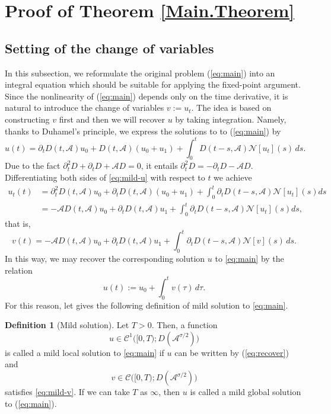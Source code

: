 \documentclass[a4paper,11pt]{article} %
\theoremstyle{remark}
\theoremstyle{definition}
\newtheorem{definition}{Definition}[section]
\numberwithin{equation}{section}
\begin{document}
\section{Proof of Theorem \ref{Main.Theorem}}\label{Sec.Proof}

\subsection{Setting of the change of variables}\label{Sec.Initial}

In this subsection, we reformulate the original problem (\ref{eq:main}) into an integral equation which should be suitable for applying the fixed-point argument. Since the nonlinearity of (\ref{eq:main}) depends only on the time derivative, it is natural to introduce the change of variables $v:=u_t$. The idea is based on constructing \(v\) first and then we will recover \(u\) by taking integration. Namely, thanks to Duhamel's principle, we express the solutions to to (\ref{eq:main}) by
\begin{equation}\label{eq:mild-u}
u(t)
=
\partial_tD(t,\mathcal{A})u_0
+
D(t,\mathcal{A})(u_0+u_1)
+
\int_0^t
D(t-s,\mathcal{A})\mathcal{N}[u_t](s)\,ds.
\end{equation}
Due to the fact $\partial_t^2 D+\partial_t D+\mathcal{A}D=0$, it entails
$\partial_t^2D=-\partial_tD-\mathcal{A}D$. Differentiating both sides of \eqref{eq:mild-u} with respect to $t$ we achieve
\begin{align*}
u_t(t)
&=
\partial_t^2D(t,\mathcal{A})u_0
+
\partial_tD(t,\mathcal{A})(u_0+u_1)
+
\int_0^t
\partial_tD(t-s,\mathcal{A})
\mathcal{N}[u_t](s)ds
\\
&=
-\mathcal{A}D(t,\mathcal{A})u_0
+
\partial_tD(t,\mathcal{A})u_1
+
\int_0^t
\partial_tD(t-s,\mathcal{A})
\mathcal{N}[u_t](s)ds,
\end{align*}
that is,
\begin{equation}\label{eq:mild-v}
v(t)
=
-\mathcal{A}D(t,\mathcal{A})u_0
+
\partial_tD(t,\mathcal{A})u_1
+
\int_0^t
\partial_tD(t-s,\mathcal{A})
\mathcal{N}[v](s)\,ds.
\end{equation}
In this way, we may recover the corresponding solution \(u\) to \eqref{eq:main} by the relation
\begin{equation}\label{eq:recover}
u(t)
:=
u_0
+
\int_0^t
v(\tau)\,d\tau.
\end{equation}
For this reason, let gives the following definition of mild solution to \eqref{eq:main}.

\begin{definition}[Mild solution]
Let \(T>0\). Then, a function
$$u\in \mathcal{C}^1\Big([0,T);D(\mathcal{A}^{\sigma/2})\Big)$$
is called a mild local solution to \eqref{eq:main} if $u$ can be written by (\ref{eq:recover}) and
$$ v\in \mathcal{C}\Big([0,T);D(\mathcal{A}^{\sigma/2})\Big)$$
satisfies \eqref{eq:mild-v}. If we can take $T$ as $\infty$, then $u$ is called a mild global solution to (\ref{eq:main}).
\end{definition}
\end{document}
